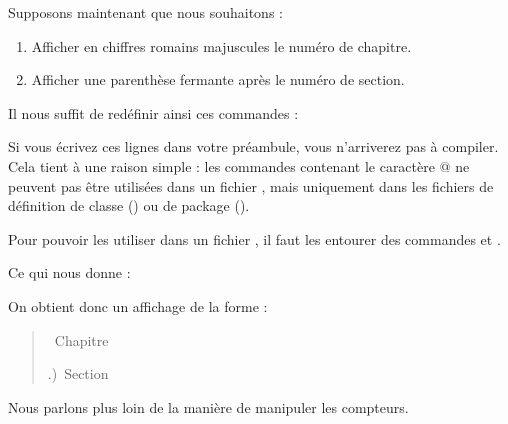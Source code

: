 Supposons maintenant que nous souhaitons  :
\begin{enumerate}
\item Afficher en chiffres romains majuscules le numéro de chapitre.
\item Afficher une parenthèse fermante après le numéro de section.
\end{enumerate}

Il nous suffit de redéfinir ainsi ces commandes :

\begin{latexcode}
\renewcommand \thechapter {\@Roman\c@chapter}
\renewcommand \thesection {\thechapter.\@arabic\c@section)~}
\end{latexcode} 

\label{makeatletter}Si vous écrivez ces lignes dans votre préambule, vous n'arriverez pas à compiler. Cela tient à une raison simple : les commandes contenant le caractère @ ne peuvent pas être  utilisées dans un fichier , mais uniquement dans les fichiers de définition de classe () ou de package ().

Pour pouvoir les utiliser dans un fichier , il faut les entourer des commandes  et .

Ce qui nous donne : 

\begin{latexcode}
\makeatletter
\renewcommand \thechapter {\@Roman\c@chapter}
\renewcommand \thesection {\thechapter.\@arabic\c@section)}
\makeatother
\end{latexcode}


\makeatletter
\let\oldthechapter\thechapter
\let\oldthesection\thesection
\renewcommand \thechapter {\@Roman\c@chapter}
\renewcommand \thesection {\thechapter.\@arabic\c@section)}
\makeatother

On obtient donc un affichage de la forme :


\begin{quotation}
\thechapter~Chapitre 

\thesection~Section
\end{quotation}

\renewcommand{\thechapter}{\oldthechapter}
\renewcommand{\thesection}{\oldthesection}


\begin{plusloins}
Nous parlons plus loin de la manière de manipuler les compteurs.
\end{plusloins}

